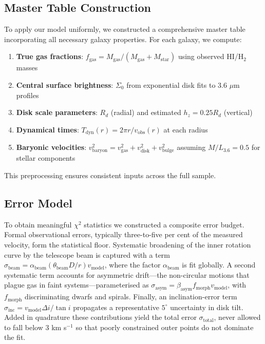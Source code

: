 \documentclass[twocolumn,prd,amsmath,amssymb,aps,superscriptaddress,nofootinbib]{revtex4-2}
\newcommand{\chisq}{\chi^2}
\begin{document}
\subsection{Master Table Construction}

To apply our model uniformly, we constructed a comprehensive master table incorporating all necessary galaxy properties. For each galaxy, we compute:

\begin{enumerate}
\item \textbf{True gas fractions}: $f_{\text{gas}} = M_{\text{gas}}/(M_{\text{gas}} + M_{\text{star}})$ using observed HI/H$_2$ masses
\item \textbf{Central surface brightness}: $\Sigma_0$ from exponential disk fits to 3.6 $\mu$m profiles
\item \textbf{Disk scale parameters}: $R_d$ (radial) and estimated $h_z = 0.25 R_d$ (vertical)
\item \textbf{Dynamical times}: $T_{\text{dyn}}(r) = 2\pi r/v_{\text{obs}}(r)$ at each radius
\item \textbf{Baryonic velocities}: $v_{\text{baryon}}^2 = v_{\text{gas}}^2 + v_{\text{disk}}^2 + v_{\text{bulge}}^2$ assuming $M/L_{3.6} = 0.5$ for stellar components
\end{enumerate}

This preprocessing ensures consistent inputs across the full sample.

\subsection{Error Model}

To obtain meaningful $\chisq$ statistics we constructed a composite error budget.  Formal observational errors, typically three-to-five per cent of the measured velocity, form the statistical floor.  Systematic broadening of the inner rotation curve by the telescope beam is captured with a term $\sigma_{\mathrm{beam}} = \alpha_{\mathrm{beam}} (\theta_{\mathrm{beam}} D/r) v_{\mathrm{model}}$, where the factor $\alpha_{\mathrm{beam}}$ is fit globally.  A second systematic term accounts for asymmetric drift—the non-circular motions that plague gas in faint systems—parameterised as $\sigma_{\mathrm{asym}} = \beta_{\text{asym}} f_{\text{morph}} v_{\text{model}}$, with $f_{\text{morph}}$ discriminating dwarfs and spirals.  Finally, an inclination-error term $\sigma_{\text{inc}} = v_{\text{model}} \Delta i/\tan i$ propagates a representative $5^{\circ}$ uncertainty in disk tilt.  Added in quadrature these contributions yield the total error $\sigma_{\text{total}}$, never allowed to fall below 3 km s$^{-1}$ so that poorly constrained outer points do not dominate the fit.
\end{document}

